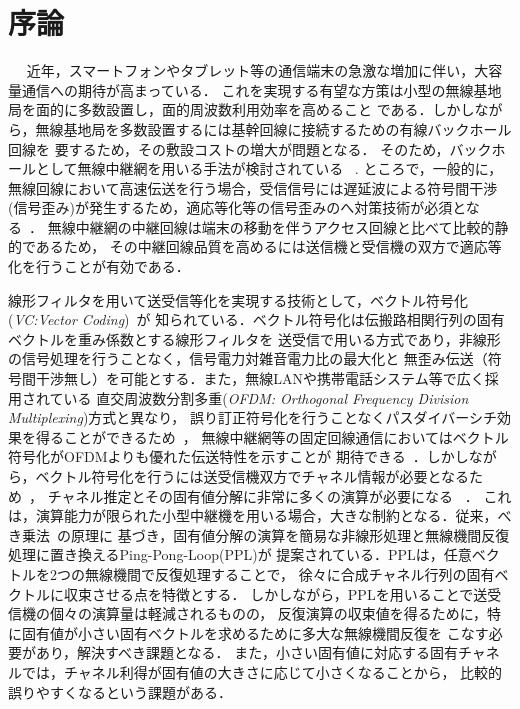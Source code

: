 \chapter{序論}
　
近年，スマートフォンやタブレット等の通信端末の急激な増加に伴い，大容量通信への期待が高まっている．
これを実現する有望な方策は小型の無線基地局を面的に多数設置し，面的周波数利用効率を高めること
である．しかしながら，無線基地局を多数設置するには基幹回線に接続するための有線バックホール回線を
要するため，その敷設コストの増大が問題となる．
そのため，バックホールとして無線中継網を用いる手法が検討されている~\cite{yamo} \cite{pabst}.
 ところで，一般的に，無線回線において高速伝送を行う場合，受信信号には遅延波による符号間干渉
 (信号歪み)が発生するため，適応等化等の信号歪みのへ対策技術が必須となる~\cite{akaiwa}．
 無線中継網の中継回線は端末の移動を伴うアクセス回線と比べて比較的静的であるため，
 その中継回線品質を高めるには送信機と受信機の双方で適応等化を行うことが有効である．

 線形フィルタを用いて送受信等化を実現する技術として，ベクトル符号化(\emph{VC:Vector Coding})~\cite{kasturia}が
知られている．ベクトル符号化は伝搬路相関行列の固有ベクトルを重み係数とする線形フィルタを
送受信で用いる方式であり，非線形の信号処理を行うことなく，信号電力対雑音電力比の最大化と
無歪み伝送（符号間干渉無し）を可能とする．また，無線LANや携帯電話システム等で広く採用されている
直交周波数分割多重(\emph{OFDM: Orthogonal Frequency Division Multiplexing})方式と異なり，
誤り訂正符号化を行うことなくパスダイバーシチ効果を得ることができるため~\cite{furukawa}，
無線中継網等の固定回線通信においてはベクトル符号化がOFDMよりも優れた伝送特性を示すことが
期待できる~\cite{furukawa,li,takeda,takanashi}．しかしながら，ベクトル符号化を行うには送受信機双方でチャネル情報が必要となるため~\cite{furukawa}，
チャネル推定とその固有値分解に非常に多くの演算が必要になる~\cite{takano} \cite{takeda2}．
これは，演算能力が限られた小型中継機を用いる場合，大きな制約となる．従来，べき乗法~\cite{strang}の原理に
基づき，固有値分解の演算を簡易な非線形処理と無線機間反復処理に置き換えるPing-Pong-Loop(PPL)が
提案されている．PPLは，任意ベクトルを2つの無線機間で反復処理することで，
徐々に合成チャネル行列の固有ベクトルに収束させる点を特徴とする．
しかしながら，PPLを用いることで送受信機の個々の演算量は軽減されるものの，
反復演算の収束値を得るために，特に固有値が小さい固有ベクトルを求めるために多大な無線機間反復を
こなす必要があり，解決すべき課題となる．
また，小さい固有値に対応する固有チャネルでは，チャネル利得が固有値の大きさに応じて小さくなることから，
比較的誤りやすくなるという課題がある．

